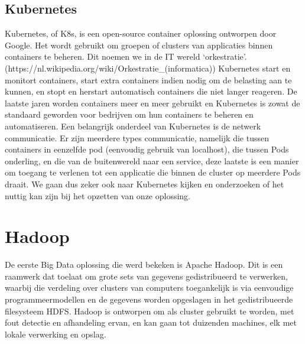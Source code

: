 \subsection{Kubernetes}
Kubernetes, of K8s, is een open-source container oplossing ontworpen door Google. Het wordt gebruikt om groepen of clusters van applicaties binnen containers te beheren. Dit noemen we in de IT wereld ‘orkestratie’. (https://nl.wikipedia.org/wiki/Orkestratie\_(informatica))
\newline
Kubernetes start en monitort containers, start extra containers indien nodig om de belasting aan te kunnen, en stopt en herstart automatisch containers die niet langer reageren.\textcite{Guthrie2022}
\newline
\newline
De laatste jaren worden containers meer en meer gebruikt en Kubernetes is zowat de standaard geworden voor bedrijven om hun containers te beheren en automatiseren.
\textcite{Razorops2022}
\newline
\newline
Een belangrijk onderdeel van Kubernetes is de netwerk communicatie. Er zijn meerdere types communicatie, namelijk die tussen containers in eenzelfde pod (eenvoudig gebruik van localhost), die tussen Pods onderling, en die van de buitenwereld naar een service, deze laatste is een manier om toegang te verlenen tot een applicatie die binnen de cluster op meerdere Pods draait.
\textcite{Kubernetes2023a}
\textcite{Kubernetes2023b}
\newline
\newline
We gaan dus zeker ook naar Kubernetes kijken en onderzoeken of het nuttig kan zijn bij het opzetten van onze oplossing.

\section{Hadoop}
De eerste Big Data oplossing die werd bekeken is Apache Hadoop. Dit is een raamwerk dat toelaat om grote sets van gegevens gedistribueerd te verwerken, waarbij die verdeling over clusters van computers toegankelijk is via eenvoudige programmeermodellen en de gegevens worden opgeslagen in het gedistribueerde filesysteem HDFS.
\newline
Hadoop is ontworpen om als cluster gebruikt te worden, met fout detectie en afhandeling ervan, en kan gaan tot duizenden machines, elk met lokale verwerking en opslag. \textcite{ASF2022}

